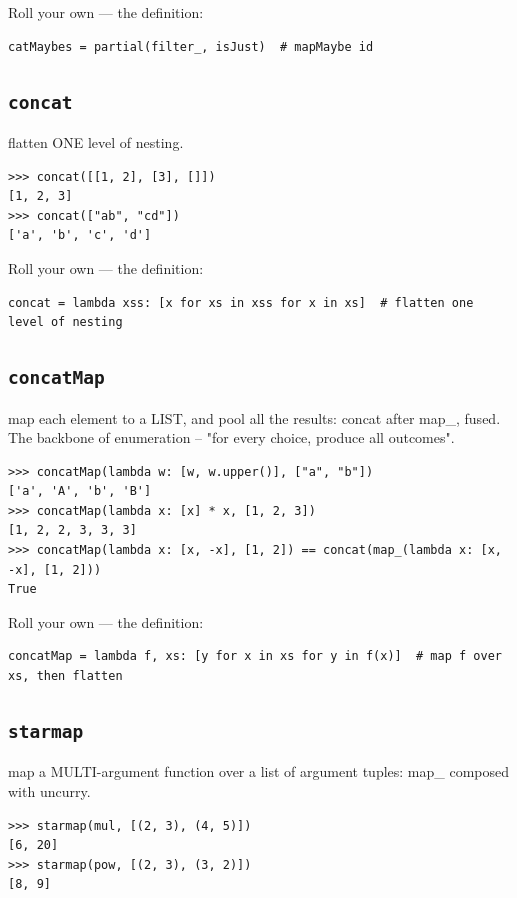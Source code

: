 \documentclass[10pt,letterpaper]{book}
\begin{document}
Roll your own --- the definition:

\begin{lstlisting}[style=ex]
catMaybes = partial(filter_, isJust)  # mapMaybe id
\end{lstlisting}

\subsection{\texttt{concat}}\label{def:concat}
flatten ONE level of nesting.
\begin{lstlisting}[style=ex]
>>> concat([[1, 2], [3], []])
[1, 2, 3]
>>> concat(["ab", "cd"])
['a', 'b', 'c', 'd']
\end{lstlisting}

Roll your own --- the definition:

\begin{lstlisting}[style=ex]
concat = lambda xss: [x for xs in xss for x in xs]  # flatten one level of nesting
\end{lstlisting}
\subsection{\texttt{concatMap}}\label{def:concatMap}
map each element to a LIST, and pool all the results: concat after map\_, fused. The backbone of enumeration -- "for every choice, produce all outcomes".
\begin{lstlisting}[style=ex]
>>> concatMap(lambda w: [w, w.upper()], ["a", "b"])
['a', 'A', 'b', 'B']
>>> concatMap(lambda x: [x] * x, [1, 2, 3])
[1, 2, 2, 3, 3, 3]
>>> concatMap(lambda x: [x, -x], [1, 2]) == concat(map_(lambda x: [x, -x], [1, 2]))
True
\end{lstlisting}

Roll your own --- the definition:

\begin{lstlisting}[style=ex]
concatMap = lambda f, xs: [y for x in xs for y in f(x)]  # map f over xs, then flatten
\end{lstlisting}
\subsection{\texttt{starmap}}\label{def:starmap}
map a MULTI-argument function over a list of argument tuples: map\_ composed with uncurry.
\begin{lstlisting}[style=ex]
>>> starmap(mul, [(2, 3), (4, 5)])
[6, 20]
>>> starmap(pow, [(2, 3), (3, 2)])
[8, 9]
\end{lstlisting}
\end{document}
